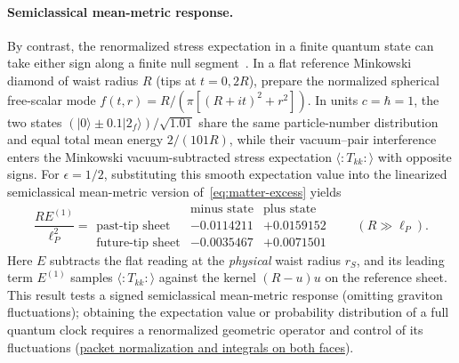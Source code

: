 \documentclass[10pt,a4paper]{article}
\numberwithin{equation}{section}
\newcommand{\repo}[2]{\href{https://github.com/sprajs/quantum-gravity/blob/main/#1}{#2}}
\begin{document}
\paragraph{Semiclassical mean-metric response.}
By contrast, the renormalized stress expectation in a finite quantum state can take either sign along a finite null segment~\cite{FewsterRoman2003}. In a flat reference Minkowski diamond of waist radius $R$ (tips at $t=0,2R$), prepare the normalized spherical free-scalar mode $f(t,r)=R/(\pi[(R+it)^2+r^2])$. In units $c=\hbar=1$, the two states $(|0\rangle\pm 0.1|2_f\rangle)/\sqrt{1.01}$ share the same particle-number distribution and equal total mean energy $2/(101R)$, while their vacuum--pair interference enters the Minkowski vacuum-subtracted stress expectation $\langle{:}T_{kk}{:}\rangle$ with opposite signs. For $\epsilon=1/2$, substituting this smooth expectation value into the linearized semiclassical mean-metric version of~\eqref{eq:matter-excess} yields
\begin{equation}
  \frac{R E^{(1)}}{\ell_P^2} =
  \begin{array}{c|rr}
    & \text{minus state} & \text{plus state}\\ \hline
   \text{past-tip sheet} & -0.0114211 & +0.0159152\\
   \text{future-tip sheet} & -0.0035467 & +0.0071501
  \end{array}
  \qquad (R\gg\ell_P).
  \label{eq:scalar-sign}
\end{equation}
Here $E$ subtracts the flat reading at the \emph{physical} waist radius $r_S$, and its leading term $E^{(1)}$ samples $\langle{:}T_{kk}{:}\rangle$ against the kernel $(R-u)u$ on the reference sheet. This result tests a signed semiclassical mean-metric response (omitting graviton fluctuations); obtaining the expectation value or probability distribution of a full quantum clock requires a renormalized geometric operator and control of its fluctuations (\repo{audit/matter-null-energy.md}{packet normalization and integrals on both faces}).
\end{document}

